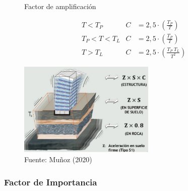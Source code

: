 \documentclass{article}%
\begin{document}
\begin{figure}[h!]%
\caption{Factor de amplificación}%
\begin{minipage}{0.5\textwidth}%

    \begin{align*}
        &T< T_{P}         &   C&=2,5\cdot\left ( \frac{T_{P}}{T} \right )\\
        &T_{P}< T< T_{L}  &   C&=2,5\cdot\left ( \frac{T_{P}}{T} \right )\\
        &T> T_{L}         &   C&=2,5\cdot\left ( \frac{T_{P}\;T_{L}}{T^{2}} \right )
    \end{align*}%
\end{minipage}%
\begin{minipage}{0.4\textwidth}%
\centering%
\includegraphics[width=6.5cm]{images/Amplificacion}%
\end{minipage}%
\caption*{Fuente: Muñoz (2020)}%
\end{figure}

%
\subsubsection{Factor de Importancia}%
\label{ssubsec:FactordeImportancia}%
\end{document}

